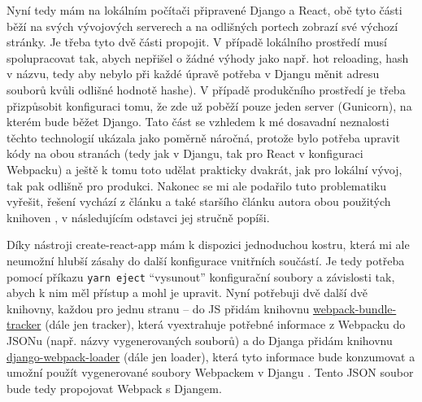     Nyní tedy mám na lokálním počítači připravené Django a React, obě tyto části běží na svých vývojových serverech a na odlišných portech zobrazí své výchozí stránky. Je třeba tyto dvě části propojit. V případě lokálního prostředí musí spolupracovat tak, abych nepřišel o žádné výhody jako např. hot reloading, hash v názvu, tedy aby nebylo při každé úpravě potřeba v Djangu měnit adresu souborů kvůli odlišné hodnotě hashe). V případě produkčního prostředí je třeba přizpůsobit konfiguraci tomu, že zde už poběží pouze jeden server (Gunicorn), na kterém bude běžet Django. Tato část se vzhledem k mé dosavadní neznalosti těchto technologií ukázala jako poměrně náročná, protože bylo potřeba upravit kódy na obou stranách (tedy jak v Djangu, tak pro React v konfiguraci Webpacku) a ještě k tomu toto udělat prakticky dvakrát, jak pro lokální vývoj, tak pak odlišně pro produkci. Nakonec se mi ale podařilo tuto problematiku vyřešit, řešení vychází z článku \cite{webpack-loader2} a také staršího článku autora obou použitých knihoven \cite{webpack-loader1}, v následujícím odstavci jej stručně popíši.
    
    Díky nástroji create-react-app \cite{cra} mám k dispozici jednoduchou kostru, která mi ale neumožní hlubší zásahy do další konfigurace vnitřních součástí. Je tedy potřeba pomocí příkazu \verb|yarn eject| \enquote{vysunout} konfigurační soubory a závislosti tak, abych k nim měl přístup a mohl je upravit. Nyní potřebuji dvě další dvě knihovny, každou pro jednu stranu -- do JS přidám knihovnu \href{https://github.com/owais/webpack-bundle-tracker}{webpack-bundle-tracker} (dále jen tracker), která vyextrahuje potřebné informace z Webpacku do JSONu \cite{webpack-bundle-tracker} (např. názvy vygenerovaných souborů) a do Djanga přidám knihovnu \href{https://github.com/owais/django-webpack-loader}{django-webpack-loader} (dále jen loader), která tyto informace bude konzumovat a umožní použít vygenerované soubory Webpackem v Djangu \cite{django-webpack-loader}. Tento JSON soubor bude tedy propojovat Webpack s Djangem.
    
